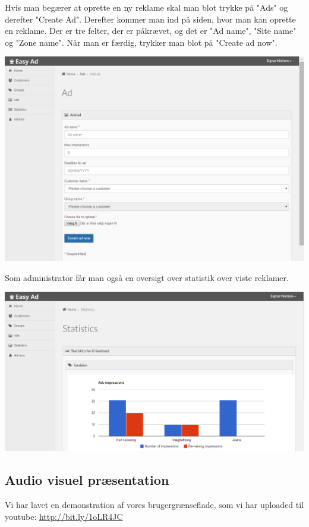 \documentclass[a4paper,12pt]{article}
\begin{document}
\newline
\newline
\newline
Hvis man begærer at oprette en ny reklame skal man blot trykke på "Ads" og derefter "Create Ad". Derefter kommer man ind på siden, hvor man kan oprette en reklame. Der er tre felter, der er påkrævet, og det er "Ad name", "Site name" og "Zone name". Når man er færdig, trykker man blot på "Create ad now".
\\
\centerline{\includegraphics[width=\textwidth]{ad_add.png}}
\newline
\newline
\newline
Som administrator får man også en oversigt over statistik over viste reklamer.
\\
\centerline{\includegraphics[width=\textwidth]{statistics.png}}

\subsection*{Audio visuel præsentation}
Vi har lavet en demonstration af vores brugergrænseflade, som vi har uploaded til youtube:
\newline
\url{http://bit.ly/1oLR4JC}
\end{document}
